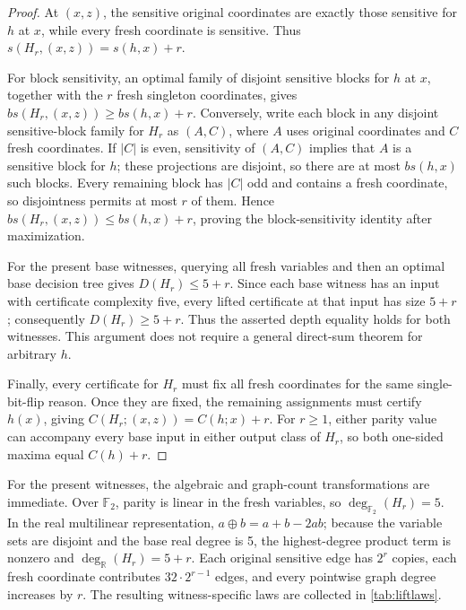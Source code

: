\documentclass[twoside,12pt,letterpaper]{article}
\theoremstyle{definition}
\begin{document}
\begin{proof}
At $(x,z)$, the sensitive original coordinates are exactly those sensitive for $h$ at $x$, while every fresh coordinate is sensitive. Thus $s(H_r,(x,z))=s(h,x)+r$.

For block sensitivity, an optimal family of disjoint sensitive blocks for $h$ at $x$, together with the $r$ fresh singleton coordinates, gives $bs(H_r,(x,z))\ge bs(h,x)+r$. Conversely, write each block in any disjoint sensitive-block family for $H_r$ as $(A,C)$, where $A$ uses original coordinates and $C$ fresh coordinates. If $|C|$ is even, sensitivity of $(A,C)$ implies that $A$ is a sensitive block for $h$; these projections are disjoint, so there are at most $bs(h,x)$ such blocks. Every remaining block has $|C|$ odd and contains a fresh coordinate, so disjointness permits at most $r$ of them. Hence $bs(H_r,(x,z))\le bs(h,x)+r$, proving the block-sensitivity identity after maximization.

For the present base witnesses, querying all fresh variables and then an optimal base decision tree gives $D(H_r)\le5+r$. Since each base witness has an input with certificate complexity five, every lifted certificate at that input has size $5+r$; consequently $D(H_r)\ge5+r$. Thus the asserted depth equality holds for both witnesses. This argument does not require a general direct-sum theorem for arbitrary $h$.

Finally, every certificate for $H_r$ must fix all fresh coordinates for the same single-bit-flip reason. Once they are fixed, the remaining assignments must certify $h(x)$, giving $C(H_r;(x,z))=C(h;x)+r$. For $r\ge1$, either parity value can accompany every base input in either output class of $H_r$, so both one-sided maxima equal $C(h)+r$.
\end{proof}

For the present witnesses, the algebraic and graph-count transformations are immediate. Over $\mathbb F_2$, parity is linear in the fresh variables, so $\deg_{\mathbb F_2}(H_r)=5$. In the real multilinear representation, $a\oplus b=a+b-2ab$; because the variable sets are disjoint and the base real degree is 5, the highest-degree product term is nonzero and $\deg_{\mathbb R}(H_r)=5+r$. Each original sensitive edge has $2^r$ copies, each fresh coordinate contributes $32\cdot2^{r-1}$ edges, and every pointwise graph degree increases by $r$. The resulting witness-specific laws are collected in \cref{tab:liftlaws}.
\end{document}
